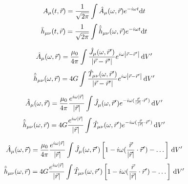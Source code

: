 \begin{equation}
    A_\mu(t,\vec{r})=\frac{1}{\sqrt{2\pi}}
    \int\hat{A}_{\mu}(\omega,\vec{r})e^{-i\omega t}\mathrm{d} t
\end{equation}
\begin{equation}
    \bar{h}_{\mu\nu}(t,\vec{r})=\frac{1}{\sqrt{2\pi}}
    \int\hat{\bar{h}}_{\mu\nu}(\omega,\vec{r})e^{-i\omega t}\mathrm{d} t
\end{equation}

\begin{equation}
    \hat{A}_{\mu}(\omega,\vec{r})=\frac{\mu_0}{4\pi}\int\frac{\hat{J}_{\mu}(\omega,\vec{r}')}{\left\lvert\vec{r}-\vec{r}'\right\rvert}e^{i\omega\left\lvert\vec{r}-\vec{r}'\right\rvert}\,\mathrm{d} V'
\end{equation}
\begin{equation}
    \hat{\bar{h}}_{\mu\nu}(\omega,\vec{r})=4G\int\frac{\hat{T}_{\mu\nu}(\omega,\vec{r}')}{\left\lvert\vec{r}-\vec{r}'\right\rvert}e^{i\omega\left\lvert\vec{r}-\vec{r}'\right\rvert}\,\mathrm{d} V'
\end{equation}

\begin{equation}
    \hat{A}_{\mu}(\omega,\vec{r})=\frac{\mu_0}{4\pi}\frac{e^{i\omega\left\lvert\vec{r}\right\rvert}}{\left\lvert\vec{r}\right\rvert}\int\hat{J}_{\mu}(\omega,\vec{r}')e^{-i\omega(\frac{\vec{r}}{\left\lvert\vec{r}\right\rvert}\cdot\vec{r}')}\,\mathrm{d} V'
\end{equation}
\begin{equation}
    \hat{\bar{h}}_{\mu\nu}(\omega,\vec{r})=4G\frac{e^{i\omega\left\lvert\vec{r}\right\rvert}}{\left\lvert\vec{r}\right\rvert}\int\hat{T}_{\mu\nu}(\omega,\vec{r}')e^{-i\omega(\frac{\vec{r}}{\left\lvert\vec{r}\right\rvert}\cdot\vec{r}')}\,\mathrm{d} V'
\end{equation}

\begin{equation}
    \hat{A}_{\mu}(\omega,\vec{r})=\frac{\mu_0}{4\pi}\frac{e^{i\omega\left\lvert\vec{r}\right\rvert}}{\left\lvert\vec{r}\right\rvert}\int\hat{J}_{\mu}(\omega,\vec{r}')\left[1-i\omega(\frac{\vec{r}}{\left\lvert\vec{r}\right\rvert}\cdot\vec{r}')-\dots\right]\,\mathrm{d} V'
\end{equation}
\begin{equation}
    \hat{\bar{h}}_{\mu\nu}(\omega,\vec{r})=4G\frac{e^{i\omega\left\lvert\vec{r}\right\rvert}}{\left\lvert\vec{r}\right\rvert}\int\hat{T}_{\mu\nu}(\omega,\vec{r}')\left[1-i\omega(\frac{\vec{r}}{\left\lvert\vec{r}\right\rvert}\cdot\vec{r}')-\dots\right]\,\mathrm{d} V'
\end{equation}

